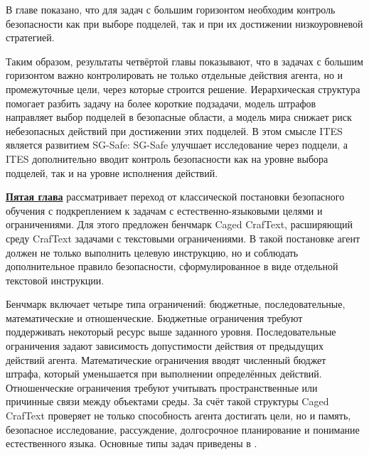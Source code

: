В главе показано, что для задач с большим горизонтом необходим контроль безопасности как при выборе подцелей, так и при их достижении низкоуровневой стратегией.

Таким образом, результаты четвёртой главы показывают, что в задачах с большим горизонтом важно контролировать не только отдельные действия агента, но и промежуточные цели, через которые строится решение. Иерархическая структура помогает разбить задачу на более короткие подзадачи, модель штрафов направляет выбор подцелей в безопасные области, а модель мира снижает риск небезопасных действий при достижении этих подцелей. В этом смысле ITES является развитием SG-Safe: SG-Safe улучшает исследование через подцели, а ITES дополнительно вводит контроль безопасности как на уровне выбора подцелей, так и на уровне исполнения действий.

\underline{\textbf{Пятая глава}} рассматривает переход от классической постановки безопасного обучения с подкреплением к задачам с естественно-языковыми целями и ограничениями. Для этого предложен бенчмарк Caged CrafText, расширяющий среду CrafText задачами с текстовыми ограничениями. В такой постановке агент должен не только выполнить целевую инструкцию, но и соблюдать дополнительное правило безопасности, сформулированное в виде отдельной текстовой инструкции.

Бенчмарк включает четыре типа ограничений: бюджетные, последовательные, математические и отношенческие. Бюджетные ограничения требуют поддерживать некоторый ресурс выше заданного уровня. Последовательные ограничения задают зависимость допустимости действия от предыдущих действий агента. Математические ограничения вводят численный бюджет штрафа, который уменьшается при выполнении определённых действий. Отношенческие ограничения требуют учитывать пространственные или причинные связи между объектами среды. За счёт такой структуры Caged CrafText проверяет не только способность агента достигать цели, но и память, безопасное исследование, рассуждение, долгосрочное планирование и понимание естественного языка. Основные типы задач приведены в .

